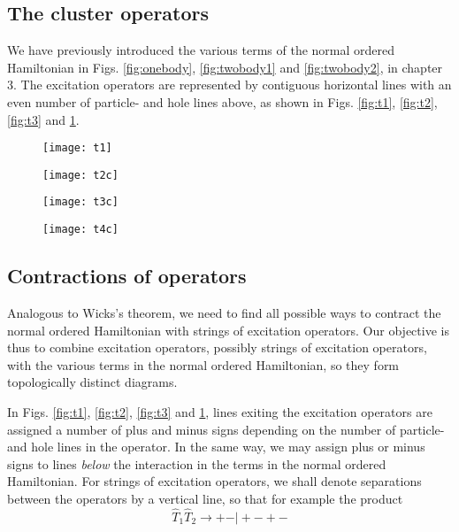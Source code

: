 \subsection{The cluster operators}

We have previously introduced the various terms of the normal ordered
Hamiltonian in Figs. \ref{fig:onebody}, \ref{fig:twobody1} and
\ref{fig:twobody2}, in chapter 3. The excitation operators are
represented by contiguous horizontal lines with an even number of
particle- and hole lines above, as shown in Figs. \ref{fig:t1},
\ref{fig:t2}, \ref{fig:t3} and \ref{fig:t4}.
\begin{figure}[!htb]
  \centering
  \texttt{[image: t1]}
  \caption{}\label{fig:t1}
\endminipage\hfill
{}
  \centering
  \texttt{[image: t2c]}
  \caption{}\label{fig:t2}
\endminipage\hfill
{}
  \centering
  \texttt{[image: t3c]}
  \caption{}\label{fig:t3}
\endminipage\hfill
{}
  \centering
  \texttt{[image: t4c]}
  \caption{}\label{fig:t4}
\endminipage\hfill
\end{figure}



\subsection{Contractions of operators}

Analogous to Wicks's theorem, we need to find all possible ways to
contract the normal ordered Hamiltonian with strings of excitation
operators.  Our objective is thus to combine excitation operators,
possibly strings of excitation operators, with the various terms in
the normal ordered Hamiltonian, so they form topologically distinct
diagrams.

In Figs. \ref{fig:t1}, \ref{fig:t2}, \ref{fig:t3} and
\ref{fig:t4}, lines exiting the excitation operators are assigned a
number of plus and minus signs depending on the number of particle-
and hole lines in the operator. In the same way, we may assign plus or
minus signs to lines \emph{below} the interaction in the terms in the
normal ordered Hamiltonian. For strings of excitation operators, we
shall denote separations between the operators by a vertical line, so
that for example the product
\begin{equation}
\hat{T}_1 \hat{T}_2 \rightarrow + - \vert + - + - 
\label{eqn:exprod}
\end{equation}

